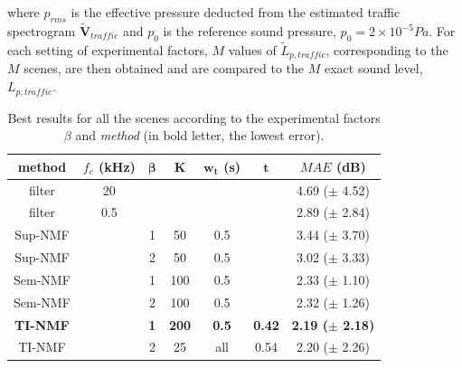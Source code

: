 \documentclass[twocolumn,a4paper,10pt]{article}
\begin{document}
where $p_{rms}$ is the effective pressure deducted from the estimated traffic spectrogram $\mathbf{\tilde{V}}_{traffic}$ and $p_0$ is the reference sound pressure, $p_0 = 2 \times 10^{-5} Pa$.  For each setting of experimental factors, $M$ values of $\tilde{L}_{p,traffic}$, corresponding to the $M$ scenes, are then obtained and are compared to the $M$ exact sound level, $L_{p,traffic}$.


\begin{table}[t]
\centering
\begin{tabular}{@{}ccccccc@{}}
\toprule
\textbf{method} & $f_c$ (kHz) & $\mathbf{\beta}$ & $\mathbf{K}$ & $\mathbf{w_t}$ (s) &   $\mathbf{t}$ & \textbf{$MAE$} (dB) \\ \midrule
filter & 20  &  &  &  &  & 4.69 ($\pm$ 4.52) \\
filter & 0.5 &  &  &  &  & 2.89 ($\pm$ 2.84) \\ \hline \hline
Sup-NMF &  & 1 & 50 & 0.5  &  & 3.44 ($\pm$ 3.70) \\
Sup-NMF &  & 2 & 50 & 0.5  &  & 3.02 ($\pm$ 3.33) \\ \hline \hline
Sem-NMF &  & 1 & 100 & 0.5 &   & 2.33 ($\pm$ 1.10) \\
Sem-NMF &  & 2 & 100 & 0.5 &   & 2.32 ($\pm$ 1.26) \\ \hline \hline
\textbf{TI-NMF} &  & \textbf{1} & \textbf{200} & \textbf{0.5} &  \textbf{0.42} &\textbf{2.19 ($\pm$ 2.18)} \\
TI-NMF &  & 2 & 25 & all &  0.54 & 2.20 ($\pm$ 2.26)\\ \bottomrule
\end{tabular}
\caption{Best results for all the scenes according to the experimental factors $\beta$ and \textit{method} (in bold letter, the lowest error).}
\label{tab:results}
\end{table}
\end{document}
